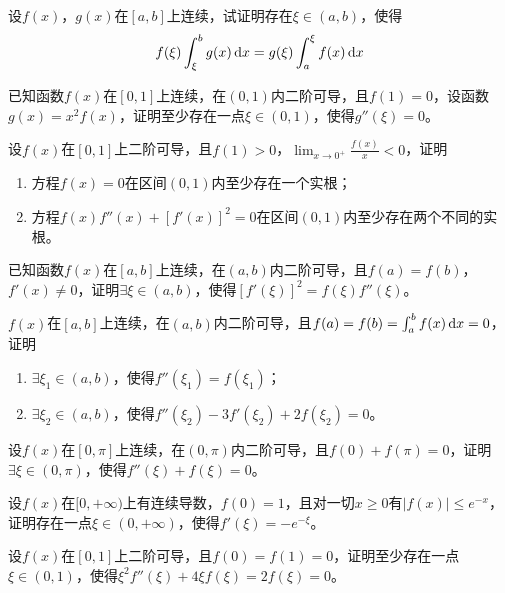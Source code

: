 \begin{example}
	设$f(x)$，$g(x)$在$[a,b]$上连续，试证明存在$\xi\in(a,b)$，使得\[f(\xi)\int_{\xi}^{b}g(x)\,\mathrm{d} x=g(\xi)\int_{a}^{\xi}f(x)\,\mathrm{d} x\]
\end{example}

\begin{example}
	已知函数$f(x)$在$[0,1]$上连续，在$(0,1)$内二阶可导，且$f(1)=0$，设函数$g(x)=x^2f(x)$，证明至少存在一点$\xi\in(0,1)$，使得$g''(\xi)=0$。
\end{example}

\begin{example}
	设$f(x)$在$[0,1]$上二阶可导，且$f(1)>0$，$\lim_{x\to 0^+}\frac{f(x)}{x}<0$，证明
	\begin{enumerate}
		\item 方程$f(x)=0$在区间$(0,1)$内至少存在一个实根；
		\item 方程$f(x)f''(x)+[f'(x)]^2=0$在区间$(0,1)$内至少存在两个不同的实根。
	\end{enumerate}
\end{example}

\begin{example}
	已知函数$f(x)$在$[a,b]$上连续，在$(a,b)$内二阶可导，且$f(a)=f(b)$，$f'(x)\neq 0$，证明$\exists\xi\in(a,b)$，使得$[f'(\xi)]^2=f(\xi)f''(\xi)$。
\end{example}

\begin{example}
	$f(x)$在$[a,b]$上连续，在$(a,b)$内二阶可导，且$f(a)=f(b)=\int_{a}^{b}f(x)\,\mathrm{d} x=0$，证明
	\begin{enumerate}
		\item $\exists\xi_1\in(a,b)$，使得$f''(\xi_1)=f(\xi_1)$；
		\item $\exists\xi_2\in(a,b)$，使得$f''(\xi_2)-3f'(\xi_2)+2f(\xi_2)=0$。
	\end{enumerate}
\end{example}

\begin{example}
	设$f(x)$在$[0,\pi]$上连续，在$(0,\pi)$内二阶可导，且$f(0)+f(\pi)=0$，证明$\exists\xi\in(0,\pi)$，使得$f''(\xi)+f(\xi)=0$。
\end{example}

\begin{example}
	设$f(x)$在$[0,+\infty)$上有连续导数，$f(0)=1$，且对一切$x\geqslant0$有$|f(x)|\leqslant e^{-x}$，证明存在一点$\xi\in(0,+\infty)$，使得$f'(\xi)=-e^{-\xi}$。
\end{example}

\begin{example}
	设$f(x)$在$[0,1]$上二阶可导，且$f(0)=f(1)=0$，证明至少存在一点$\xi\in(0,1)$，使得$\xi^2f''(\xi)+4\xi f(\xi)=2f(\xi)=0$。
\end{example}

